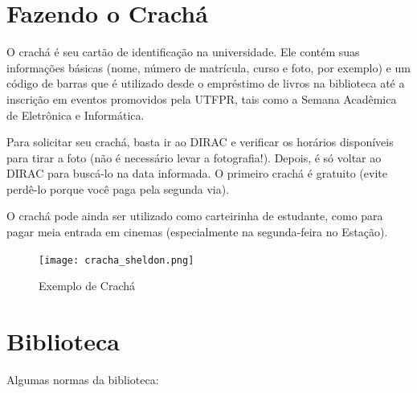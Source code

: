 \documentclass[a4paper,12pt,openany]{article}
\begin{document}
\section{Fazendo o Crachá}

O crachá é seu cartão de identificação na universidade. Ele contém suas informações básicas (nome, número de matrícula, curso e foto, por exemplo) e um código de barras que é utilizado desde o empréstimo de livros na biblioteca até a inscrição em eventos promovidos pela UTFPR, tais como a Semana Acadêmica de Eletrônica e Informática.

Para solicitar seu crachá, basta ir ao DIRAC e verificar os horários disponíveis para tirar a foto (não é necessário levar a fotografia!). Depois, é só voltar ao DIRAC para buscá-lo na data informada. O primeiro crachá é gratuito (evite perdê-lo porque você paga pela segunda via).

O crachá pode ainda ser utilizado como carteirinha de estudante, como para pagar meia entrada em cinemas (especialmente na segunda-feira no Estação).

	\begin{figure}[ht!]  \centering
		\texttt{[image: cracha\_sheldon.png]}
		\caption{Exemplo de Crachá}
	\end{figure}


\newpage
\section{Biblioteca}

Algumas normas da biblioteca:
\end{document}
